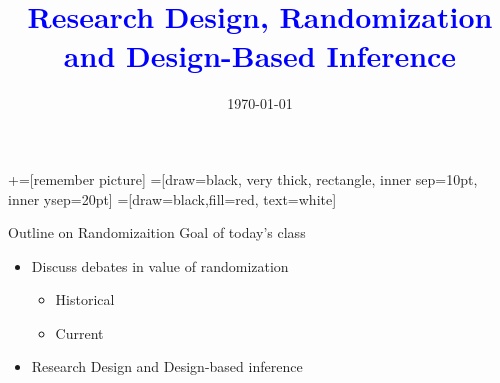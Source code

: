 \documentclass[notes,11pt, aspectratio=169]{beamer}
\title[]{\textcolor{blue}{Research Design, Randomization and Design-Based Inference }}
\author[PGP]{}
\institute[FRBNY]{\small{Paul Goldsmith-Pinkham}}
\date{\today}
\begin{document}
\newcommand\marktopleft[1]{%
    \tikz[overlay,remember picture] 
        \node (marker-#1-a) at (-.3em,.3em) {};%
}
\newcommand\markbottomright[2]{%
    \tikz[overlay,remember picture] 
        \node (marker-#1-b) at (0em,0em) {};%
}
+=[remember picture] 
 =[draw=black, very thick, rectangle, inner sep=10pt, inner ysep=20pt]
 =[draw=black,fill=red, text=white]

\begin{frame}
\maketitle

\end{frame}

\begin{frame}{Outline on Randomizaition}
  Goal of today's class
  \begin{itemize}
  \item Discuss debates in value of randomization
    \begin{itemize}
    \item Historical
    \item Current
    \end{itemize}
  \item Research Design and Design-based inference
  \end{itemize}
\end{frame}
\end{document}
